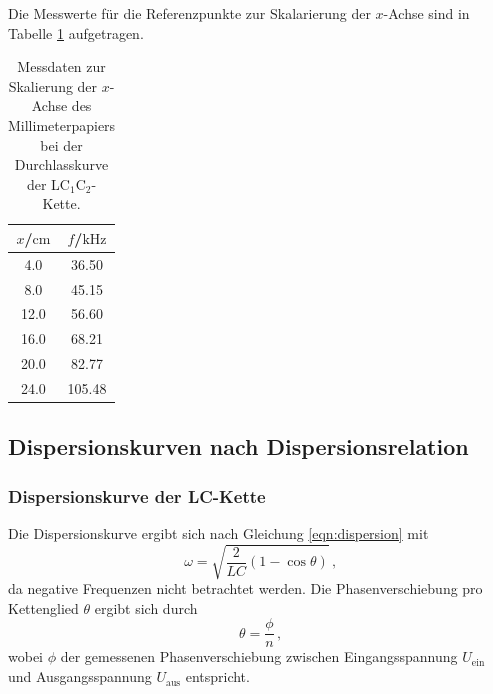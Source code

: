 Die Messwerte für die Referenzpunkte zur Skalarierung der $x$-Achse sind in Tabelle
\ref{tab:skalaLCC} aufgetragen.

\begin{table}
	\caption{Messdaten zur Skalierung der $x$-Achse des Millimeterpapiers bei der
	Durchlasskurve der LC$_1$C$_2$-Kette.}
	\label{tab:skalaLCC}
	\centering
	\begin{tabular}{cc}
		\toprule
		$x$/$\si{\centi\meter}$ & $f$/$\si{\kilo\hertz}$ \\
		\midrule
		4.0                     & 36.50                  \\
		8.0                     & 45.15                  \\
		12.0                    & 56.60                  \\
		16.0                    & 68.21                  \\
		20.0                    & 82.77                  \\
		24.0                    & 105.48                 \\
		\bottomrule
	\end{tabular}
\end{table}




\FloatBarrier
\subsection{Dispersionskurven nach Dispersionsrelation}

\subsubsection{Dispersionskurve der LC-Kette}
Die Dispersionskurve ergibt sich nach Gleichung \eqref{eqn:dispersion} mit
\begin{equation}
	\label{eqn:dispisi}
	\omega = \sqrt{\frac{2}{LC}(1-\cos\theta)} \, \text{,}
\end{equation}
da negative Frequenzen nicht betrachtet werden.
Die Phasenverschiebung pro Kettenglied $\theta$ ergibt sich durch
\begin{equation}
	\theta = \frac{\phi}{n} \, \text{,}
\end{equation}
wobei $\phi$ der gemessenen Phasenverschiebung zwischen Eingangsspannung $U_{\text{ein}}$
und Ausgangsspannung $U_{\text{aus}}$ entspricht.

